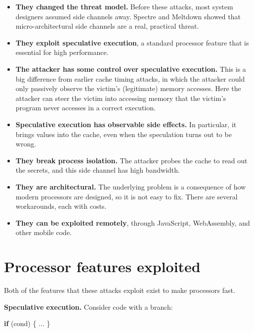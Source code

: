\documentclass[
  letterpaper,
]{scrbook}
\newenvironment{Shaded}{\begin{snugshade}}{\end{snugshade}}
\newcommand{\ControlFlowTok}[1]{\textcolor[rgb]{0.00,0.23,0.31}{\textbf{#1}}}
\newcommand{\NormalTok}[1]{\textcolor[rgb]{0.00,0.23,0.31}{#1}}
\newcommand{\OperatorTok}[1]{\textcolor[rgb]{0.37,0.37,0.37}{#1}}
\theoremstyle{definition}
\theoremstyle{plain}
\theoremstyle{plain}
\theoremstyle{remark}
\begin{document}
\begin{itemize}
\item
  \textbf{They changed the threat model.} Before these attacks, most
  system designers assumed side channels away. Spectre and Meltdown
  showed that micro-architectural side channels are a real, practical
  threat. {}
\item
  \textbf{They exploit speculative execution}, a standard processor
  feature that is essential for high performance.
\item
  \textbf{The attacker has some control over speculative execution.}
  This is a big difference from earlier cache timing attacks, in which
  the attacker could only passively observe the victim's (legitimate)
  memory accesses. Here the attacker can steer the victim into accessing
  memory that the victim's program never accesses in a correct
  execution.
\item
  \textbf{Speculative execution has observable side effects.} In
  particular, it brings values into the cache, even when the speculation
  turns out to be wrong.
\item
  \textbf{They break process isolation.} The attacker probes the cache
  to read out the secrets, and this side channel has high bandwidth.
\item
  \textbf{They are architectural.} The underlying problem is a
  consequence of how modern processors are designed, so it is not easy
  to fix. There are several workarounds, each with costs.
\item
  \textbf{They can be exploited remotely}, through JavaScript,
  WebAssembly, and other mobile code.
\end{itemize}

\section{Processor features
exploited}\label{processor-features-exploited}

Both of the features that these attacks exploit exist to make processors
fast.

\textbf{Speculative execution.} Consider code with a branch:

\begin{Shaded}
\begin{Highlighting}[]
\ControlFlowTok{if} \OperatorTok{(}\NormalTok{cond}\OperatorTok{)} \OperatorTok{\{}
    \OperatorTok{...}
\OperatorTok{\}}
\end{Highlighting}
\end{Shaded}
\end{document}
